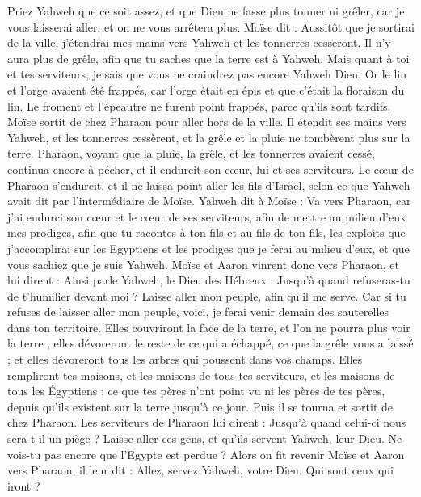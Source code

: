 \begin{multicols}{2}
Priez Yahweh que ce soit assez, et que Dieu ne fasse plus tonner ni grêler, car je vous laisserai aller, et on ne vous arrêtera plus.
Moïse dit : Aussitôt que je sortirai de la ville, j'étendrai mes mains vers Yahweh et les tonnerres cesseront. Il n'y aura plus de grêle, afin que tu saches que la terre est à Yahweh.
Mais quant à toi et tes serviteurs, je sais que vous ne craindrez pas encore Yahweh Dieu.
Or le lin et l'orge avaient été frappés, car l'orge était en épis et que c’était la floraison du lin.
Le froment et l'épeautre ne furent point frappés, parce qu'ils sont tardifs.
Moïse sortit de chez Pharaon pour aller hors de la ville. Il étendit ses mains vers Yahweh, et les tonnerres cessèrent, et la grêle et la pluie ne tombèrent plus sur la terre.
Pharaon, voyant que la pluie, la grêle, et les tonnerres avaient cessé, continua encore à pécher, et il endurcit son cœur, lui et ses serviteurs.
Le cœur de Pharaon s'endurcit, et il ne laissa point aller les fils d'Israël, selon ce que Yahweh avait dit par l’intermédiaire de Moïse.
\VerseOne{}Yahweh dit à Moïse : Va vers Pharaon, car j'ai endurci son cœur et le cœur de ses serviteurs, afin de mettre au milieu d'eux mes prodiges,
afin que tu racontes à ton fils et au fils de ton fils, les exploits que j’accomplirai sur les Egyptiens et les prodiges que je ferai au milieu d'eux, et que vous sachiez que je suis Yahweh.
Moïse et Aaron vinrent donc vers Pharaon, et lui dirent : Ainsi parle Yahweh, le Dieu des Hébreux : Jusqu'à quand refuseras-tu de t'humilier devant moi ? Laisse aller mon peuple, afin qu'il me serve.
Car si tu refuses de laisser aller mon peuple, voici, je ferai venir demain des sauterelles dans ton territoire.
Elles couvriront la face de la terre, et l'on ne pourra plus voir la terre ; elles dévoreront le reste de ce qui a échappé, ce que la grêle vous a laissé ; et elles dévoreront tous les arbres qui poussent dans vos champs.
Elles rempliront tes maisons, et les maisons de tous tes serviteurs, et les maisons de tous les Égyptiens ; ce que tes pères n'ont point vu ni les pères de tes pères, depuis qu’ils existent sur la terre jusqu'à ce jour. Puis il se tourna et sortit de chez Pharaon.
Les serviteurs de Pharaon lui dirent : Jusqu'à quand celui-ci nous sera-t-il un piège ? Laisse aller ces gens, et qu'ils servent Yahweh, leur Dieu. Ne vois-tu pas encore que l'Egypte est perdue ?
Alors on fit revenir Moïse et Aaron vers Pharaon, il leur dit : Allez, servez Yahweh, votre Dieu. Qui sont ceux qui iront ?

\end{multicols}
